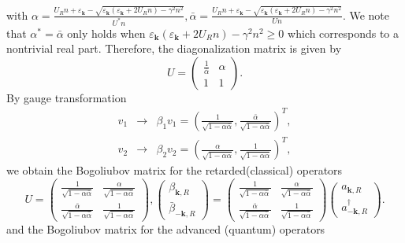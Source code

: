 \documentclass[aps,superscriptaddress,notitlepage,longbibliography]{revtex4-1}
\begin{document}
with $\alpha=\frac{U_{R}n+\varepsilon_{\bm{k}}-\sqrt{\varepsilon_{\bm{k}}(\varepsilon_{\bm{k}}+2U_{R}n)-\gamma^{2}n^{2}}}{U^{\ast}n},\bar{\alpha}=\frac{U_{R}n+\varepsilon_{\bm{k}}-\sqrt{\varepsilon_{\bm{k}}(\varepsilon_{\bm{k}}+2U_{R}n)-\gamma^{2}n^{2}}}{Un}$.
We note that $\alpha^{\ast}=\bar{\alpha}$ only holds when $\varepsilon_{\bm{k}}(\varepsilon_{\bm{k}}+2U_{R}n)-\gamma^{2}n^{2}\geqslant0$
which corresponds to a nontrivial real part. Therefore, the diagonalization
matrix is given by 
\begin{equation}
U=\left(\begin{array}{cc}
\frac{1}{\bar{\alpha}} & \alpha\\
1 & 1
\end{array}\right).
\end{equation}
By gauge transformation 
\begin{eqnarray}
v_{1} & \rightarrow & \beta_{1}v_{1}=\left(\frac{1}{\sqrt{1-\alpha\bar{\alpha}}},\frac{\bar{\alpha}}{\sqrt{1-\alpha\bar{\alpha}}}\right)^{T},\\
v_{2} & \rightarrow & \beta_{2}v_{2}=\left(\frac{\alpha}{\sqrt{1-\alpha\bar{\alpha}}},\frac{1}{\sqrt{1-\alpha\bar{\alpha}}}\right)^{T},
\end{eqnarray}
we obtain the Bogoliubov matrix for the retarded(classical) operators
\begin{equation}
U=\left(\begin{array}{cc}
\frac{1}{\sqrt{1-\alpha\bar{\alpha}}} & \frac{\alpha}{\sqrt{1-\alpha\bar{\alpha}}}\\
\frac{\bar{\alpha}}{\sqrt{1-\alpha\bar{\alpha}}} & \frac{1}{\sqrt{1-\alpha\bar{\alpha}}}
\end{array}\right),\left(\begin{array}{c}
\beta_{\bm{k},R}\\
\bar{\beta}_{-\bm{k},R}
\end{array}\right)=\left(\begin{array}{cc}
\frac{1}{\sqrt{1-\alpha\bar{\alpha}}} & \frac{\alpha}{\sqrt{1-\alpha\bar{\alpha}}}\\
\frac{\bar{\alpha}}{\sqrt{1-\alpha\bar{\alpha}}} & \frac{1}{\sqrt{1-\alpha\bar{\alpha}}}
\end{array}\right)\left(\begin{array}{c}
a_{\bm{k},R}\\
a_{-\bm{k},R}^{\dagger}
\end{array}\right).
\end{equation}
and the Bogoliubov matrix for the advanced (quantum) operators 
\end{document}
